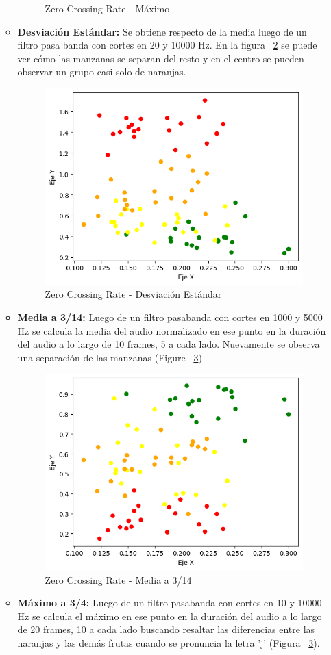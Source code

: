 \documentclass[a4paper, 12pt]{article}
\begin{document}
\begin{itemize}
\begin{itemize}
\begin{figure}[h]
                \caption{Zero Crossing Rate - Máximo}
                \label{ZCR 2}
            \end{figure}
        \item \textbf{Desviación Estándar:} Se obtiene respecto de la media luego de un filtro pasa banda con cortes en 20 y 10000 Hz. En la figura ~\ref{ZCR 3} se puede ver cómo las manzanas se separan del resto y en el centro se pueden observar un grupo casi solo de naranjas.
            \begin{figure}[h]
                \centering
                \includegraphics[width=0.4\linewidth]{ZCR3.png}
                \caption{Zero Crossing Rate - Desviación Estándar}
                \label{ZCR 3}
            \end{figure}
        \item \textbf{Media a 3/14:} Luego de un filtro pasabanda con cortes en 1000 y 5000 Hz se calcula la media del audio normalizado en ese punto en la duración del audio a lo largo de 10 frames, 5 a cada lado. Nuevamente se observa una separación de las manzanas (Figure ~\ref{ZCR 4})
            \begin{figure}[h]
                \centering
                \includegraphics[width=0.4\linewidth]{ZCR4.png}
                \caption{Zero Crossing Rate - Media a 3/14}
                \label{ZCR 4}
            \end{figure}
        \item \textbf{Máximo a 3/4:} Luego de un filtro pasabanda con cortes en 10 y 10000 Hz se calcula el máximo en ese punto en la duración del audio a lo largo de 20 frames, 10 a cada lado buscando resaltar las diferencias entre las naranjas y las demás frutas cuando se pronuncia la letra 'j' (Figura ~\ref{ZCR 4}).

\end{itemize}
\end{itemize}
\end{document}
